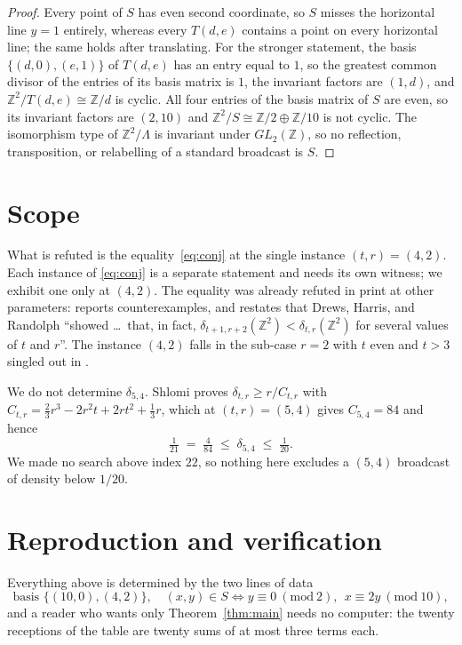\documentclass[11pt]{amsart}
\theoremstyle{remark}
\newcommand{\ZZ}{\mathbb{Z}}
\newcommand{\dens}{\delta}
\newcommand{\Tstd}{T}
\begin{document}
\begin{proof}
Every point of $S$ has even second coordinate, so $S$ misses the horizontal line
$y=1$ entirely, whereas every $\Tstd(d,e)$ contains a point on every horizontal
line; the same holds after translating. For the stronger statement, the basis
$\{(d,0),(e,1)\}$ of $\Tstd(d,e)$ has an entry equal to $1$, so the greatest
common divisor of the entries of its basis matrix is $1$, the invariant factors
are $(1,d)$, and $\ZZ^2/\Tstd(d,e)\cong\ZZ/d$ is cyclic. All four entries of the
basis matrix of $S$ are even, so its invariant factors are $(2,10)$ and
$\ZZ^2/S\cong\ZZ/2\oplus\ZZ/10$ is not cyclic. The isomorphism type of
$\ZZ^2/\Lambda$ is invariant under $GL_2(\ZZ)$, so no reflection, transposition,
or relabelling of a standard broadcast is $S$.
\end{proof}

\section{Scope}

What is refuted is the equality~\eqref{eq:conj} at the single instance
$(t,r)=(4,2)$. Each instance of \eqref{eq:conj} is a separate statement and needs
its own witness; we exhibit one only at $(4,2)$. The equality was already refuted
in print at other parameters: \cite{DHRcode} reports counterexamples, and
\cite{HvH} restates that Drews, Harris, and Randolph ``showed \dots\ that, in
fact, $\dens_{t+1,r+2}(\ZZ^2)<\dens_{t,r}(\ZZ^2)$ for several values of $t$ and
$r$''. The instance $(4,2)$ falls in the sub-case $r=2$ with $t$ even and $t>3$
singled out in \cite{DHRcode}.

\medskip\noindent
We do not determine $\dens_{5,4}$. Shlomi \cite{Shlomi} proves
$\dens_{t,r}\ge r/C_{t,r}$ with
$C_{t,r}=\tfrac23r^3-2r^2t+2rt^2+\tfrac13r$, which at $(t,r)=(5,4)$ gives
$C_{5,4}=84$ and hence
\[
 \tfrac1{21}\;=\;\tfrac4{84}\;\le\;\dens_{5,4}\;\le\;\tfrac1{20}.
\]
We made no search above index $22$, so nothing here excludes a $(5,4)$ broadcast
of density below $1/20$.

\section{Reproduction and verification}\label{sec:verif}

Everything above is determined by the two lines of data
\[
 \text{basis } \{(10,0),(4,2)\},
 \quad
 (x,y)\in S \iff y\equiv0\ (\mathrm{mod}\ 2),\ \ x\equiv2y\ (\mathrm{mod}\ 10),
\]
and a reader who wants only Theorem~\ref{thm:main} needs no computer: the twenty
receptions of the table are twenty sums of at most three terms each.
\end{document}
